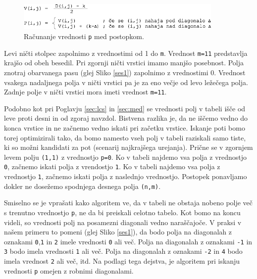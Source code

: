 \documentclass[a4paper, 12pt, twoside]{book}
\begin{document}
\begin{figure}[placement h]
\begin{center}
\includegraphics[width=10cm]{ses2.png}
\end{center}
\caption{Računanje vrednosti {\tt p} med postopkom.}
\label{ses2}
\end{figure}

Levi ničti stolpec zapolnimo z vrednostimi od 1 do {\tt m}. Vrednost {\tt m=11} predstavlja krajšo od obeh besedil. Pri zgornji ničti vrstici imamo manjšo posebnost. Polja znotraj obarvanega pasu (glej Sliko \ref{ses1}) zapolnimo z vrednostimi 0. Vrednost vsakega nadaljnega polja v ničti vrstici pa je za eno večje od levo ležečega polja. Zadnje polje v ničti vrstici mora imeti vrednost {\tt m=11}.

Podobno kot pri Poglavju \ref{sec:lcs} in \ref{sec:med} se vrednosti polj v tabeli išče od leve proti desni in od zgoraj navzdol. Bistvena razlika je, da ne iščemo vedno do konca vrstice in ne začnemo vedno iskati pri začetku vrstice. Iskanje poti bomo torej optimizirali tako, da bomo namesto vseh polj v tabeli raziskali samo tiste, ki so možni kandidati za pot (scenarij najkrajšega urejanja). Prične se v zgornjem levem polju {\tt (1,1)} z vrednostjo {\tt p=0}. Ko v tabeli najdemo vsa polja z vrednostjo {\tt 0}, začnemo iskati polja z vrendostjo {\tt 1}. Ko v tabeli najdemo vsa polja z vrednostjo {\tt 1}, začnemo iskati polja z naslednjo vrednostjo. Postopek ponavljamo dokler ne dosežemo spodnjega desnega polja {\tt (n,m)}.

Smiselno se je vprašati kako algoritem ve, da v tabeli ne obstaja nobeno polje več s trenutno vrednostjo {\tt p}, ne da bi preiskali celotno tabelo. Kot bomo na koncu videli, so vrednosti polj na posamezni diagonali vedno naraščajoče. V praksi v našem primeru to pomeni (glej Sliko \ref{ses1}), da bodo polja na diagonalah z oznakami {\tt 0},{\tt 1} in {\tt 2} imele vrednosti {\tt 0} ali več. Polja na diagonalah z oznakami {\tt -1} in {\tt 3} bodo imela vrednosti {\tt 1} ali več. Polja na diagonalah z oznakami {\tt -2} in {\tt 4} bodo imela vrednost {\tt 2} ali več, itd. Na podlagi tega dejstva, je algoritem pri iskanju vrednosti {\tt p} omejen z robnimi diagonalami.

\pagebreak
\end{document}
